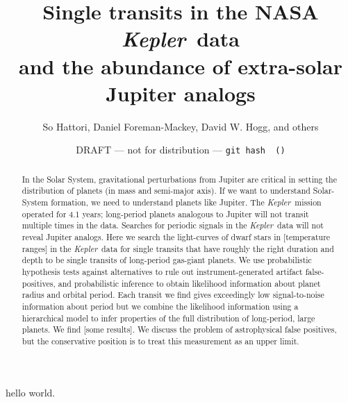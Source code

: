 \documentclass[12pt, preprint]{aastex}
\newcounter{affil}
\newcommand{\project}[1]{\textsl{#1}}
\newcommand{\Kepler}{\project{Kepler}}
\begin{document}
\title{%
  Single transits in the NASA \Kepler\ data\\
  and the abundance of extra-solar Jupiter analogs}

\author{%
  So Hattori\altaffilmark{\ref{nyuad}},
  Daniel Foreman-Mackey\altaffilmark{\ref{ccpp}},
  David W. Hogg\altaffilmark{\ref{ccpp}, \ref{cds}, \ref{mpia}},
  and others}
\label{nyuad}
\label{ccpp}
\label{cds}
\label{mpia}

\date{~\hfill
  DRAFT --- not for distribution --- \texttt{git hash \githash\ (\gitdate)}
  \hfill~}

\begin{abstract}
In the Solar System, gravitational perturbations from Jupiter are
critical in setting the distribution of planets (in mass and
semi-major axis).
If we want to understand Solar-System formation, we need to understand
planets like Jupiter.
The \Kepler\ mission operated for 4.1 years; long-period planets
analogous to Jupiter will not transit multiple times in the data.
Searches for periodic signals in the \Kepler\ data will not reveal
Jupiter analogs.
Here we search the light-curves of dwarf stars in [temperature ranges]
in the \Kepler\ data for single transits that have roughly the right
duration and depth to be single transits of long-period gas-giant
planets.
We use probabilistic hypothesis tests against alternatives to rule out
instrument-generated artifact false-positives, and probabilistic
inference to obtain likelihood information about planet radius and
orbital period.
Each transit we find gives exceedingly low signal-to-noise information
about period but we combine the likelihood information using a
hierarchical model to infer properties of the full distribution of
long-period, large planets.
We find [some results].
We discuss the problem of astrophysical false positives, but the
conservative position is to treat this measurement as an upper limit.
\end{abstract}

hello world.
\end{document}
